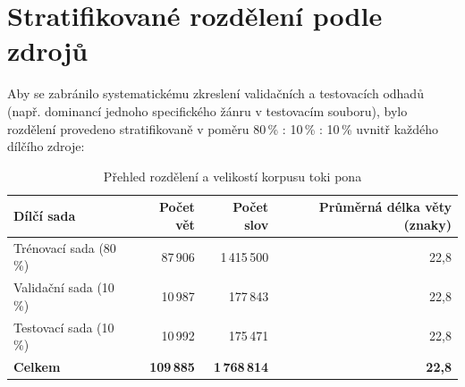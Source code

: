 \section{Stratifikované rozdělení podle zdrojů}
Aby se zabránilo systematickému zkreslení validačních a testovacích odhadů (např. dominancí jednoho specifického žánru v testovacím souboru), bylo rozdělení provedeno stratifikovaně v poměru 80\,\% : 10\,\% : 10\,\% uvnitř každého dílčího zdroje:
\begin{table}[htbp]
    \centering
    \caption{Přehled rozdělení a velikostí korpusu toki pona}
    \label{tab:korpus_stats}
    \begin{tabular}{lrrr}
        \toprule
        Dílčí sada & Počet vět & Počet slov & Průměrná délka věty (znaky) \\
        \midrule
        Trénovací sada (80\,\%) & 87\,906 & 1\,415\,500 & 22{,}8 \\
        Validační sada (10\,\%) & 10\,987 & 177\,843 & 22{,}8 \\
        Testovací sada (10\,\%)  & 10\,992 & 175\,471 & 22{,}8 \\
        \midrule
        \textbf{Celkem} & \textbf{109\,885} & \textbf{1\,768\,814} & \textbf{22{,}8} \\
        \bottomrule
    \end{tabular}
\end{table}
